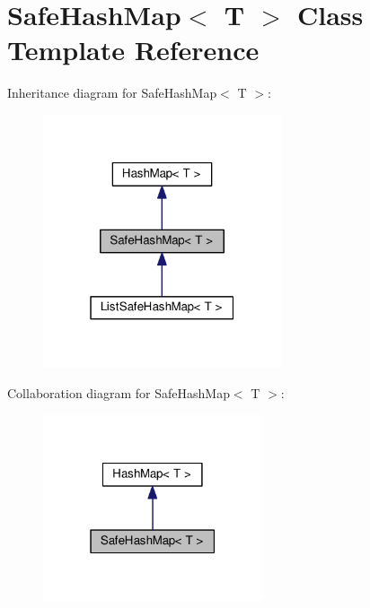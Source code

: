 \hypertarget{classSafeHashMap}{}\section{Safe\+Hash\+Map$<$ T $>$ Class Template Reference}
\label{classSafeHashMap}


Inheritance diagram for Safe\+Hash\+Map$<$ T $>$\+:\nopagebreak
\begin{figure}[H]
\begin{center}
\leavevmode
\includegraphics[width=199pt]{classSafeHashMap__inherit__graph}
\end{center}
\end{figure}


Collaboration diagram for Safe\+Hash\+Map$<$ T $>$\+:\nopagebreak
\begin{figure}[H]
\begin{center}
\leavevmode
\includegraphics[width=183pt]{classSafeHashMap__coll__graph}
\end{center}
\end{figure}
